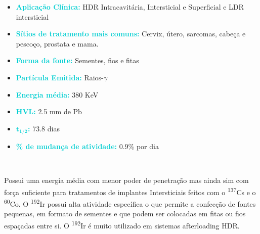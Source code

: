 \documentclass[11pt,a4paper]{article}
\begin{document}
		
	\begin{tcolorbox}[width=\textwidth, colback={white}, colbacktitle={DarkTurquoise!50!white}, title={$\bigstar$ \LobsterTwo{Irídio 192} $\bigstar$}, coltitle={CarnationPink}, colframe={DarkTurquoise}, fonttitle=\rmfamily\bfseries\Large, breakable]
			\begin{itemize}
				\item \textcolor{DarkTurquoise}{\textbf{Aplicação Clínica:}} HDR Intracavitária, Intersticial e Superficial e LDR intersticial
				\item \textcolor{DarkTurquoise}{\textbf{Sítios de tratamento mais comuns:}} Cervix, útero, sarcomas, cabeça e pescoço, prostata e mama.
				\item \textcolor{DarkTurquoise}{\textbf{Forma da fonte:}} Sementes, fios e fitas
				\item \textcolor{DarkTurquoise}{\textbf{Partícula Emitida:}} Raios-$\gamma$
				\item \textcolor{DarkTurquoise}{\textbf{Energia média:}} 380 KeV
				\item \textcolor{DarkTurquoise}{\textbf{HVL:}} 2.5 mm de Pb
				\item \textcolor{DarkTurquoise}{\textbf{$\mathbf{t_{1/2}}$:}} 73.8 dias
				\item \textcolor{DarkTurquoise}{\textbf{\% de mudança de atividade:}} 0.9\% por dia
			\end{itemize}
	\end{tcolorbox}
			\

			Possui uma energia média com menor poder de penetração mas ainda sim com força suficiente para tratamentos de implantes Intersticiais feitos com o \textsuperscript{137}Cs e o \textsuperscript{60}Co. O \textsuperscript{192}Ir possui alta atividade específica o que permite a confecção de fontes pequenas, em formato de sementes e que podem ser colocadas em fitas ou fios espaçadas entre si. O \textsuperscript{192}Ir é muito utilizado em sistemas afterloading HDR.

			\
\end{document}
